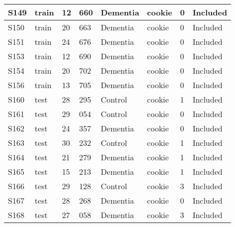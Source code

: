 \begin{center}
\begin{longtable}{|l|l|l|l|l|l|l|l|}
S149           & train                 & 12              & 660     & Dementia       & cookie          & 0            & Included      \\ \hline
S150           & train                 & 20              & 663     & Dementia       & cookie          & 0            & Included      \\ \hline
S151           & train                 & 24              & 676     & Dementia       & cookie          & 0            & Included      \\ \hline
S153           & train                 & 12              & 690     & Dementia       & cookie          & 0            & Included      \\ \hline
S154           & train                 & 20              & 702     & Dementia       & cookie          & 0            & Included      \\ \hline
S156           & train                 & 13              & 705     & Dementia       & cookie          & 0            & Included      \\ \hline
S160           & test                  & 28              & 295     & Control        & cookie          & 1            & Included      \\ \hline
S161           & test                  & 29              & 054     & Control        & cookie          & 0            & Included      \\ \hline
S162           & test                  & 24              & 357     & Dementia       & cookie          & 0            & Included      \\ \hline
S163           & test                  & 30              & 232     & Control        & cookie          & 1            & Included      \\ \hline
S164           & test                  & 21              & 279     & Dementia       & cookie          & 1            & Included      \\ \hline
S165           & test                  & 15              & 213     & Dementia       & cookie          & 1            & Included      \\ \hline
S166           & test                  & 29              & 128     & Control        & cookie          & 3            & Included      \\ \hline
S167           & test                  & 28              & 268     & Dementia       & cookie          & 0            & Included      \\ \hline
S168           & test                  & 27              & 058     & Dementia       & cookie          & 3            & Included      \\ \hline

\end{longtable}
\end{center}
